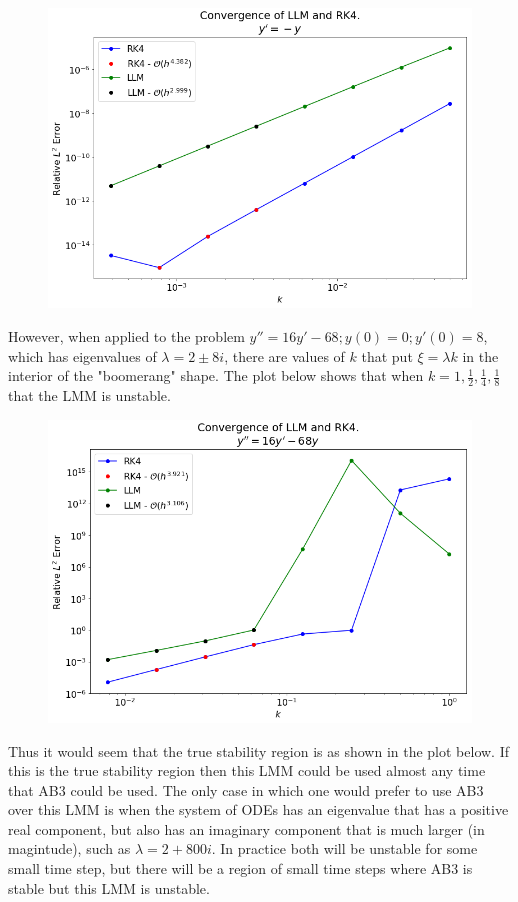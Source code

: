 \documentclass[final,oneside,onecolumn]{article}
\begin{document}
\begin{enumerate}
\begin{figure}[H]
	\centering
	\includegraphics[width=.9\linewidth]{hw5_p4b_stable_order}
\end{figure}

However, when applied to the problem $y'' = 16 y' - 68; y(0)=0; y'(0)=8$, which has eigenvalues of $\lambda = 2 \pm 8i$, there are values of $k$ that put $\xi = \lambda k$ in the interior of the "boomerang" shape. The plot below shows that when $k = 1, \frac{1}{2}, \frac{1}{4}, \frac{1}{8}$ that the LMM is unstable. 

\begin{figure}[H]
	\centering
	\includegraphics[width=.9\linewidth]{hw5_p4b_unstable_order}
\end{figure}

Thus it would seem that the true stability region is as shown in the plot below. If this is the true stability region then this LMM could be used almost any time that AB3 could be used. The only case in which one would prefer to use AB3 over this LMM is when the system of ODEs has an eigenvalue that has a positive real component, but also has an imaginary component that is much larger (in magintude), such as $\lambda = 2+800i$. In practice both will be unstable for some small time step, but there will be a region of small time steps where AB3 is stable but this LMM is unstable.


\end{enumerate}
\end{document}
